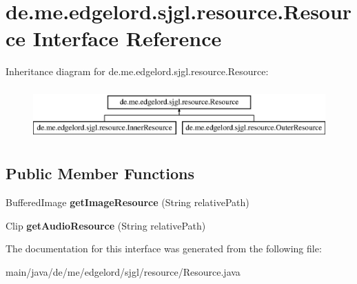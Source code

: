 \hypertarget{interfacede_1_1me_1_1edgelord_1_1sjgl_1_1resource_1_1_resource}{}\section{de.\+me.\+edgelord.\+sjgl.\+resource.\+Resource Interface Reference}
\label{interfacede_1_1me_1_1edgelord_1_1sjgl_1_1resource_1_1_resource}
Inheritance diagram for de.\+me.\+edgelord.\+sjgl.\+resource.\+Resource\+:\begin{figure}[H]
\begin{center}
\leavevmode
\includegraphics[height=2.000000cm]{interfacede_1_1me_1_1edgelord_1_1sjgl_1_1resource_1_1_resource}
\end{center}
\end{figure}
\subsection*{Public Member Functions}
\begin{DoxyCompactItemize}
\item 
\mbox{\label{interfacede_1_1me_1_1edgelord_1_1sjgl_1_1resource_1_1_resource_afd545482234815b373f42771fe5eb2ac}} 
Buffered\+Image {\bfseries get\+Image\+Resource} (String relative\+Path)
\item 
\mbox{\label{interfacede_1_1me_1_1edgelord_1_1sjgl_1_1resource_1_1_resource_ad569dc2c82905184e636d78b26ebf902}} 
Clip {\bfseries get\+Audio\+Resource} (String relative\+Path)
\end{DoxyCompactItemize}


The documentation for this interface was generated from the following file\+:\begin{DoxyCompactItemize}
\item 
main/java/de/me/edgelord/sjgl/resource/Resource.\+java\end{DoxyCompactItemize}

